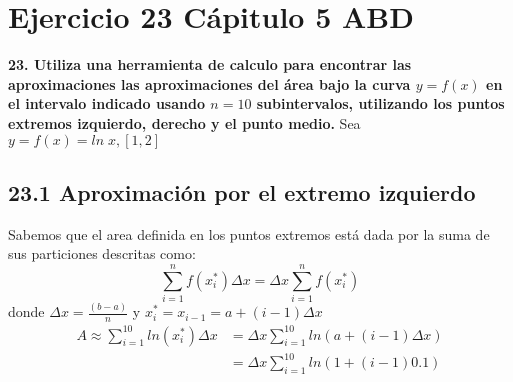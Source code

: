 \chapter*{Ejercicio 23 Cápitulo 5 ABD}
\textbf{23. Utiliza una herramienta de calculo para encontrar las aproximaciones las aproximaciones del área bajo la curva $y=f(x)$ en el intervalo indicado usando $n=10$ subintervalos, utilizando los puntos extremos izquierdo, derecho y el punto medio.}
Sea $y=f(x)=ln \;x,[1,2]$

\sectionfont{\fontsize{11}{15}\selectfont}
\indent \section*{23.1 Aproximación por el extremo izquierdo}
Sabemos que el area definida en los puntos extremos está dada por la suma de sus particiones descritas como:
\[\sum_{i=1}^{n}f(x^*_i)\Delta x=\Delta x\sum_{i=1}^{n}f(x^*_i)\]
donde $\Delta x = \frac{(b-a)}{n}$ y $x_i^*=x_{i-1}=a+(i-1)\Delta x$
\begin{align*}
	A\approx\sum_{i=1}^{10}ln(x_i^*)\Delta x & = \Delta x \sum_{i=1}^{10}ln(a+(i-1)\Delta x) \\
	                                         & =\Delta x \sum_{i=1}^{10}ln(1+(i-1)0.1)
\end{align*}
